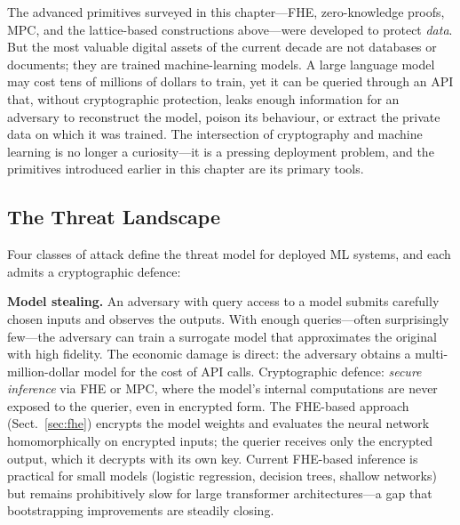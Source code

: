 The advanced primitives surveyed in this chapter---FHE, zero-knowledge proofs, MPC, and the lattice-based constructions above---were developed to protect \emph{data}.  But the most valuable digital assets of the current decade are not databases or documents; they are trained machine-learning models.  A large language model may cost tens of millions of dollars to train, yet it can be queried through an API that, without cryptographic protection, leaks enough information for an adversary to reconstruct the model, poison its behaviour, or extract the private data on which it was trained.  The intersection of cryptography and machine learning is no longer a curiosity---it is a pressing deployment problem, and the primitives introduced earlier in this chapter are its primary tools.

\subsection{The Threat Landscape}
\label{subsec:ml-threats}

Four classes of attack define the threat model for deployed ML systems, and each admits a cryptographic defence:

\textbf{Model stealing.}  An adversary with query access to a model submits carefully chosen inputs and observes the outputs.  With enough queries---often surprisingly few---the adversary can train a surrogate model that approximates the original with high fidelity.  The economic damage is direct: the adversary obtains a multi-million-dollar model for the cost of API calls.  Cryptographic defence: \emph{secure inference} via FHE or MPC, where the model's internal computations are never exposed to the querier, even in encrypted form.  The FHE-based approach (Sect.~\ref{sec:fhe}) encrypts the model weights and evaluates the neural network homomorphically on encrypted inputs; the querier receives only the encrypted output, which it decrypts with its own key.  Current FHE-based inference is practical for small models (logistic regression, decision trees, shallow networks) but remains prohibitively slow for large transformer architectures---a gap that bootstrapping improvements are steadily closing.

